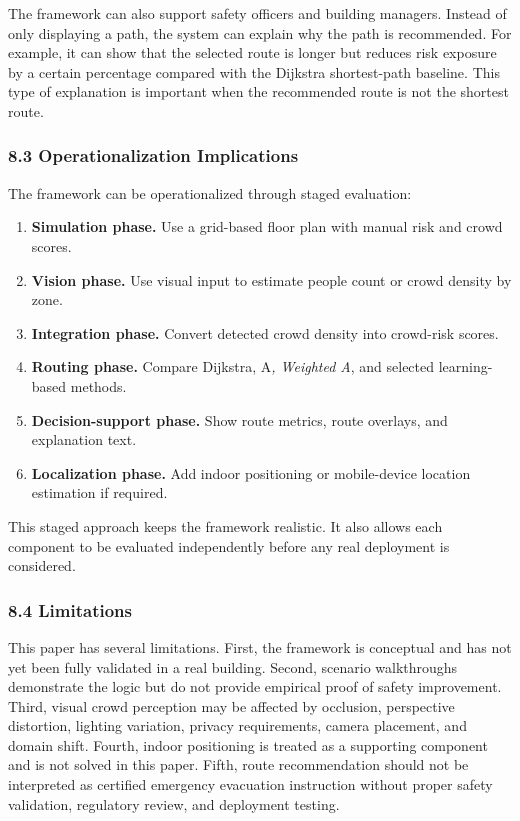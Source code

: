 \documentclass[
]{article}
\providecommand{\tightlist}{%
  \setlength{\itemsep}{0pt}\setlength{\parskip}{0pt}}
\begin{document}
The framework can also support safety officers and building managers.
Instead of only displaying a path, the system can explain why the path
is recommended. For example, it can show that the selected route is
longer but reduces risk exposure by a certain percentage compared with
the Dijkstra shortest-path baseline. This type of explanation is
important when the recommended route is not the shortest route.

\subsubsection{8.3 Operationalization
Implications}\label{operationalization-implications}

The framework can be operationalized through staged evaluation:

\begin{enumerate}
\def\labelenumi{\arabic{enumi}.}
\tightlist
\item
  \textbf{Simulation phase.} Use a grid-based floor plan with manual
  risk and crowd scores.
\item
  \textbf{Vision phase.} Use visual input to estimate people count or
  crowd density by zone.
\item
  \textbf{Integration phase.} Convert detected crowd density into
  crowd-risk scores.
\item
  \textbf{Routing phase.} Compare Dijkstra, A\emph{, Weighted A}, and
  selected learning-based methods.
\item
  \textbf{Decision-support phase.} Show route metrics, route overlays,
  and explanation text.
\item
  \textbf{Localization phase.} Add indoor positioning or mobile-device
  location estimation if required.
\end{enumerate}

This staged approach keeps the framework realistic. It also allows each
component to be evaluated independently before any real deployment is
considered.

\subsubsection{8.4 Limitations}\label{limitations}

This paper has several limitations. First, the framework is conceptual
and has not yet been fully validated in a real building. Second,
scenario walkthroughs demonstrate the logic but do not provide empirical
proof of safety improvement. Third, visual crowd perception may be
affected by occlusion, perspective distortion, lighting variation,
privacy requirements, camera placement, and domain shift. Fourth, indoor
positioning is treated as a supporting component and is not solved in
this paper. Fifth, route recommendation should not be interpreted as
certified emergency evacuation instruction without proper safety
validation, regulatory review, and deployment testing.
\end{document}
